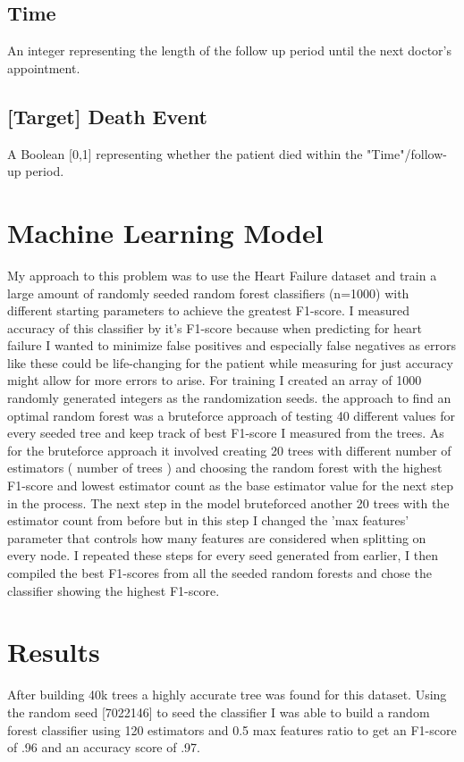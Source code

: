 \documentclass[conference]{IEEEtran}
\begin{document}
\subsection{Time}
An integer representing the length of the follow up period until the next doctor's appointment.
\subsection{[Target] Death Event}
A Boolean [0,1] representing whether the patient died within the "Time"/follow-up period.

\section{Machine Learning Model}
My approach to this problem was to use the Heart Failure dataset and train a large amount of randomly seeded random forest classifiers (n=1000) with different starting parameters to achieve the greatest F1-score. I measured accuracy of this classifier by it's F1-score because when predicting for heart failure I wanted to minimize false positives and especially false negatives as errors like these could be life-changing for the patient while measuring for just accuracy might allow for more errors to arise. For training I created an array of 1000 randomly generated integers as the randomization seeds. the approach to find an optimal random forest was a bruteforce approach of testing 40 different values for every seeded tree and keep track of best F1-score I measured from the trees. As for the bruteforce approach it involved creating 20 trees with different number of estimators ( number of trees ) and choosing the random forest with the highest F1-score and lowest estimator count as the base estimator value for the next step in the process. The next step in the model bruteforced another 20 trees with the estimator count from before but in this step I changed the 'max features' parameter that controls how many features are considered when splitting on every node. I repeated these steps for every seed generated from earlier, I then compiled the best F1-scores from all the seeded random forests and chose the classifier showing the highest F1-score.

\section{Results}
After building 40k trees a highly accurate tree was found for this dataset. Using the random seed [7022146] to seed the classifier I was able to build a random forest classifier using 120 estimators and 0.5 max features ratio to get an F1-score of .96 and an accuracy score of .97.
\end{document}
